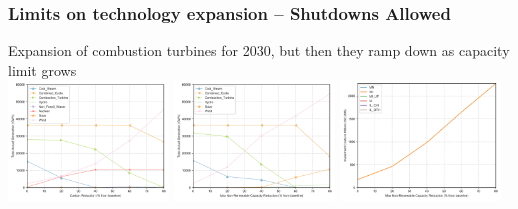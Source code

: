 \documentclass[xcolor=dvipsnames]{beamer}
\begin{document}
\begin{frame}
  \frametitle{Limits on technology expansion -- Shutdowns Allowed}
  Expansion of combustion turbines for 2030, but then they ramp down as capacity limit grows\\
  \includegraphics[width=0.32\textwidth]{includes/no_leakage_shutdowns_agg_generation_cntlreg.png}
  \includegraphics[width=0.32\textwidth]{includes/no_leakage_maxNR_agg_generation_cntlreg.png}
  \includegraphics[width=0.32\textwidth]{includes/no_leakage_maxNR_invest_costs_by_region.png}


\end{frame}
\end{document}
